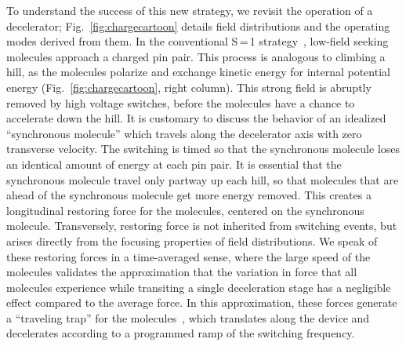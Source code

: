 \documentclass[%
 reprint,
 amsmath,amssymb,
 aps,
prl,
]{revtex4-1}
\begin{document}
To understand the success of this new strategy, we revisit the operation of a decelerator; Fig.~\ref{fig:chargecartoon} details field distributions and the operating modes derived from them.
In the conventional S\,=\,1 strategy~\cite{VanDeMeerakker2012}, low-field seeking molecules approach a charged pin pair. 
This process is analogous to climbing a hill, as the molecules polarize and exchange kinetic energy for internal potential energy (Fig.~\ref{fig:chargecartoon}, right column).
This strong field is abruptly removed by high voltage switches, before the molecules have a chance to accelerate down the hill.
It is customary to discuss the behavior of an idealized ``synchronous molecule'' which travels along the decelerator axis with zero transverse velocity.
The switching is timed so that the synchronous molecule loses an identical amount of energy at each pin pair.
It is essential that the synchronous molecule travel only partway up each hill, so that molecules that are ahead of the synchronous molecule get more energy removed.
This creates a longitudinal restoring force for the molecules, centered on the synchronous molecule.
Transversely, restoring force is not inherited from switching events, but arises directly from the focusing properties of field distributions.
We speak of these restoring forces in a time-averaged sense, where the large speed of the molecules validates the approximation that the variation in force that all molecules experience while transiting a single deceleration stage has a negligible effect compared to the average force.
In this approximation, these forces generate a ``traveling trap'' for the molecules~\cite{Bethlem2000}, which translates along the device and decelerates according to a programmed ramp of the switching frequency.
\end{document}
